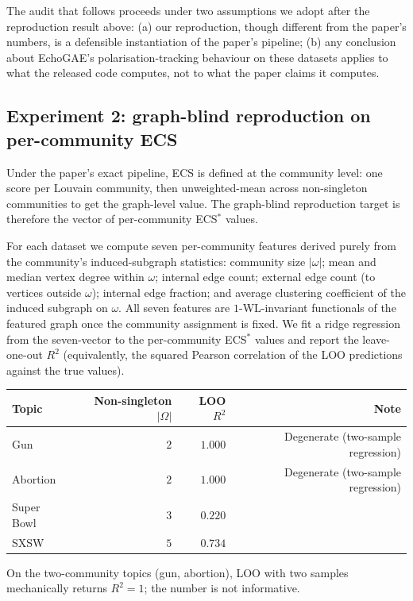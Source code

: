 The audit that follows proceeds under two assumptions we adopt
after the reproduction result above: (a) our reproduction, though
different from the paper's numbers, is a defensible instantiation
of the paper's pipeline; (b) any conclusion about EchoGAE's
polarisation-tracking behaviour on these datasets applies to what
the released code computes, not to what the paper claims it
computes.

\subsection{Experiment 2: graph-blind reproduction on per-community
ECS}

Under the paper's exact pipeline, ECS is defined at the community
level: one score per Louvain community, then unweighted-mean across
non-singleton communities to get the graph-level value. The
graph-blind reproduction target is therefore the vector of
per-community ECS$^*$ values.

For each dataset we compute seven per-community features derived
purely from the community's induced-subgraph statistics: community
size $|\omega|$; mean and median vertex degree within $\omega$;
internal edge count; external edge count (to vertices outside
$\omega$); internal edge fraction; and average clustering coefficient
of the induced subgraph on $\omega$. All seven features are
$1$-WL-invariant functionals of the featured graph once the community
assignment is fixed. We fit a ridge regression from the seven-vector
to the per-community ECS$^*$ values and report the leave-one-out
$R^2$ (equivalently, the squared Pearson correlation of the LOO
predictions against the true values).

\begin{center}
\begin{tabular}{lrrr}
\hline
Topic & Non-singleton $|\Omega|$ & LOO $R^2$ & Note \\
\hline
Gun        & $2$ & $1.000$ & Degenerate (two-sample regression)  \\
Abortion   & $2$ & $1.000$ & Degenerate (two-sample regression)  \\
Super Bowl & $3$ & $0.220$ & \\
SXSW       & $5$ & $0.734$ & \\
\hline
\end{tabular}
\end{center}

On the two-community topics (gun, abortion), LOO with two samples
mechanically returns $R^2 = 1$; the number is not informative.

